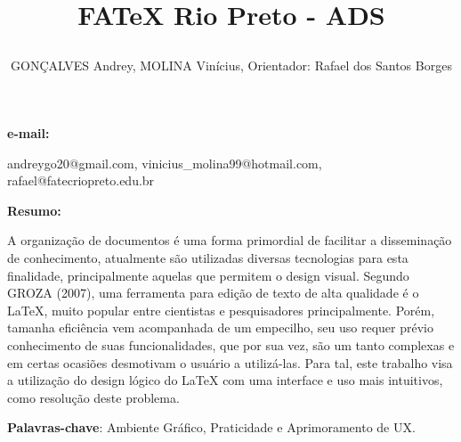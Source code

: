\documentclass[article,12pt,oneside,a4paper,english,brazil,sumario=tradicional]{abntex2}
\title{

FATeX Rio Preto - ADS

}
\date{}
\author{

GONÇALVES Andrey, MOLINA Vinícius, Orientador: Rafael dos Santos Borges

}
\begin{document}
\frenchspacing %
\maketitle

\begin{footnotesize}
    \SingleSpacing
    \noindent
    \small{\textbf{e-mail:}}
    \noindent
    \small
    \centering

andreygo20@gmail.com, vinicius\_molina99@hotmail.com, rafael@fatecriopreto.edu.br

\noindent
\end{footnotesize}




\begin{footnotesize}
\SingleSpacing
\noindent
\small{\textbf{Resumo:}}
\noindent
\small

A organização de documentos é uma forma primordial de facilitar a disseminação de conhecimento, atualmente são utilizadas diversas tecnologias 
	para esta finalidade, principalmente aquelas que permitem o design visual. Segundo GROZA (2007), uma ferramenta para edição de texto de alta qualidade 
	é o LaTeX, muito popular entre cientistas e pesquisadores principalmente. Porém, tamanha eficiência vem acompanhada de um empecilho, seu uso requer 
	prévio conhecimento de suas funcionalidades, que por sua vez, são um tanto complexas e em certas ocasiões desmotivam o usuário a utilizá-las. 
	Para tal, este trabalho visa a utilização do design lógico do LaTeX com uma interface e uso mais intuitivos, como resolução deste problema.





\noindent

\textbf{Palavras-chave}: Ambiente Gráfico, Praticidade e Aprimoramento de UX.

\end{footnotesize}




\end{document}
